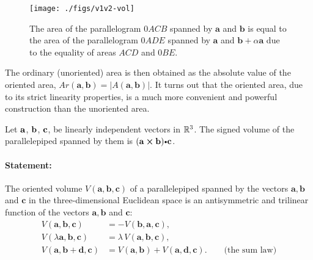 %
\begin{figure}
\begin{centering}
       \texttt{[image: ./figs/v1v2-vol]}
\par\end{centering}

\caption{The area of the parallelogram $0ACB$ spanned by $\mathbf{a}$ and
$\mathbf{b}$ is equal to the area of the parallelogram $0ADE$ spanned
by $\mathbf{a}$ and $\mathbf{b}+\alpha\mathbf{a}$ due to the equality
of areas $ACD$ and $0BE$.\label{fig:The-area-of1}}

\end{figure}



The ordinary (unoriented) area is then obtained as the absolute value
of the oriented area, $Ar(\mathbf{a},\mathbf{b})=\left|A(\mathbf{a},\mathbf{b})\right|$.
It turns out that the oriented area, due to its strict linearity properties,
is a much more convenient and powerful construction than the unoriented
area.



\begin{thm}\label{thm:vol-parallelepiped}
Let $\mathbf{ a}$, $\mathbf{ b}$, $\mathbf{ c}$, be linearly
independent vectors in $\mathbb{R}^3$. The signed volume of the
parallelepiped spanned by them is $(\crossprod{a}{b})\bp
\vector{c}$.
\end{thm}



\paragraph{Statement:}

The oriented volume $V(\mathbf{a},\mathbf{b},\mathbf{c})$ of a parallelepiped spanned
by the vectors $\mathbf{a}, \mathbf{b}$ and $\mathbf{c}$ in the three-dimen\-sion\-al
Euclidean space is an antisymmetric and trilinear function of the vectors
$\mathbf{a},\mathbf{b}$ and $\mathbf{c}$:\begin{align*}
V(\mathbf{a},\mathbf{b},\mathbf{c}) & =-V(\mathbf{b},\mathbf{a},\mathbf{c}),\\
V(\lambda\mathbf{a},\mathbf{b},\mathbf{c}) & =\lambda\, V(\mathbf{a},\mathbf{b},\mathbf{c}),\\
V(\mathbf{a},\mathbf{b}+\mathbf{d},\mathbf{c}) & =V(\mathbf{a},\mathbf{b})+V(\mathbf{a},\mathbf{d},\mathbf{c}).\qquad\text{(the sum law)}\end{align*}






